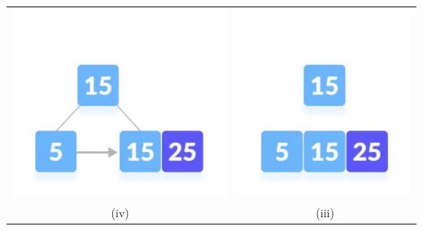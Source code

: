 \documentclass{article}
\begin{document}
\begin{table}[ht]
\begin{tabular}{c c}
                    \includegraphics[scale=0.9]{Images/bi3_2_2.jpg} &\includegraphics[scale=0.9]{Images/bi3_2_1.jpg}\\
                ({\color{red}iv}) &({\color{red}iii}) \\
            \end{tabular}
        \end{table} 
        \pagebreak
\end{document}
